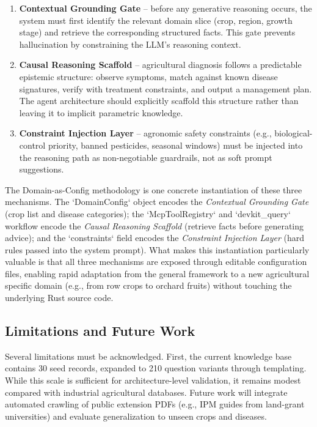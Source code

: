 \begin{enumerate}[label=\textbf{M\arabic*:},leftmargin=*]
    \item \textbf{Contextual Grounding Gate} -- before any generative reasoning occurs, the system must first identify the relevant domain slice (crop, region, growth stage) and retrieve the corresponding structured facts. This gate prevents hallucination by constraining the LLM's reasoning context.
    \item \textbf{Causal Reasoning Scaffold} -- agricultural diagnosis follows a predictable epistemic structure: observe symptoms, match against known disease signatures, verify with treatment constraints, and output a management plan. The agent architecture should explicitly scaffold this structure rather than leaving it to implicit parametric knowledge.
    \item \textbf{Constraint Injection Layer} -- agronomic safety constraints (e.g., biological-control priority, banned pesticides, seasonal windows) must be injected into the reasoning path as non-negotiable guardrails, not as soft prompt suggestions.
\end{enumerate}

The Domain-as-Config methodology is one concrete instantiation of these three mechanisms. The `DomainConfig` object encodes the \textit{Contextual Grounding Gate} (crop list and disease categories); the `McpToolRegistry` and `devkit_query` workflow encode the \textit{Causal Reasoning Scaffold} (retrieve facts before generating advice); and the `constraints` field encodes the \textit{Constraint Injection Layer} (hard rules passed into the system prompt). What makes this instantiation particularly valuable is that all three mechanisms are exposed through editable configuration files, enabling rapid adaptation from the general framework to a new agricultural specific domain (e.g., from row crops to orchard fruits) without touching the underlying Rust source code.

\subsection{Limitations and Future Work}

Several limitations must be acknowledged. First, the current knowledge base contains 30 seed records, expanded to 210 question variants through templating. While this scale is sufficient for architecture-level validation, it remains modest compared with industrial agricultural databases. Future work will integrate automated crawling of public extension PDFs (e.g., IPM guides from land-grant universities) and evaluate generalization to unseen crops and diseases.

